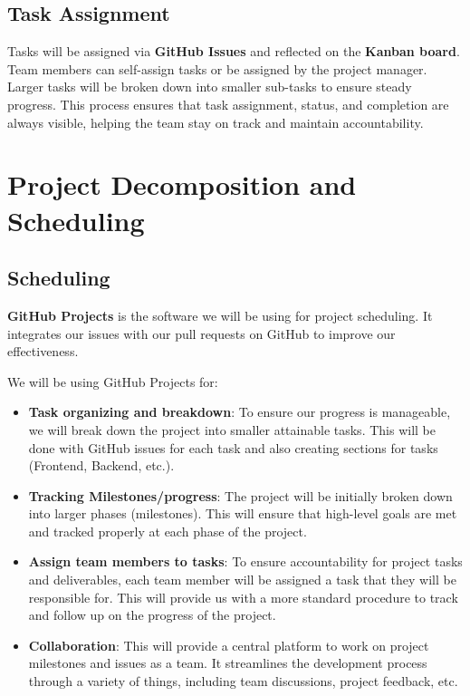 \documentclass{article}
\begin{document}
\subsection{Task Assignment}
Tasks will be assigned via \textbf{GitHub Issues} and reflected on the \textbf{Kanban board}. Team members can self-assign tasks or be assigned by the project manager. Larger tasks will be broken down into smaller sub-tasks to ensure steady progress. This process ensures that task assignment, status, and completion are always visible, helping the team stay on track and maintain accountability.

\section{Project Decomposition and Scheduling}

\subsection{Scheduling}
\textbf{GitHub Projects} is the software we will be using for project scheduling. It integrates our issues with our pull requests on GitHub to improve our effectiveness.

We will be using GitHub Projects for:
\begin{itemize}
    \item \textbf{Task organizing and breakdown}: To ensure our progress is manageable, we will break down the project into smaller attainable tasks. This will be done with GitHub issues for each task and also creating sections for tasks (Frontend, Backend, etc.).
    \item \textbf{Tracking Milestones/progress}: The project will be initially broken down into larger phases (milestones). This will ensure that high-level goals are met and tracked properly at each phase of the project.
    \item \textbf{Assign team members to tasks}: To ensure accountability for project tasks and deliverables, each team member will be assigned a task that they will be responsible for. This will provide us with a more standard procedure to track and follow up on the progress of the project.
    \item \textbf{Collaboration}: This will provide a central platform to work on project milestones and issues as a team. It streamlines the development process through a variety of things, including team discussions, project feedback, etc.
\end{itemize}
\end{document}
